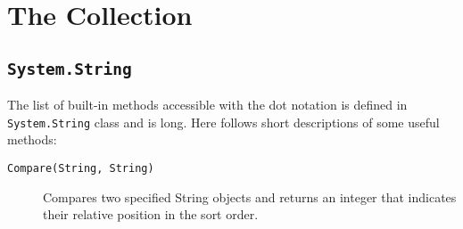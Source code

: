 \chapter{The Collection}
\label{chap:collection}

\section{\texttt{System.String}}
\label{sec:system.string}
The list of built-in methods accessible with the dot notation is defined in \lstinline|System.String| class and is long. Here follows short descriptions of some useful methods:
\begin{description}
\item[\texttt{Compare(String, String)}] Compares two specified String objects and returns an integer that indicates their relative position in the sort order.

\end{description}
